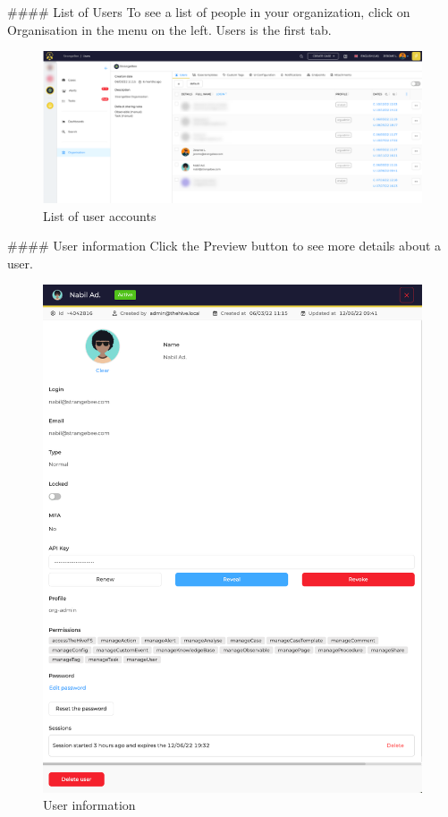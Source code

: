 


\begin{markdown}
#### List of Users
To see a list of people in your organization, click on Organisation in the menu on the left. Users is the first tab.
\end{markdown}

\begin{figure}[h!]
    \centering
    \includegraphics[width=\textwidth]{images/docs/org_admin/manage_users/organisation-list-users.png}
    \caption{List of user accounts}
    \label{fig:modules}
\end{figure}

\begin{markdown}
#### User information
Click the Preview button to see more details about a user.
\end{markdown}

\begin{figure}[H]
    \centering
    \includegraphics[width=\textwidth]{images/docs/org_admin/manage_users/organisation-user-details.png}
    \caption{User information}
    \label{fig:modules}
\end{figure}

